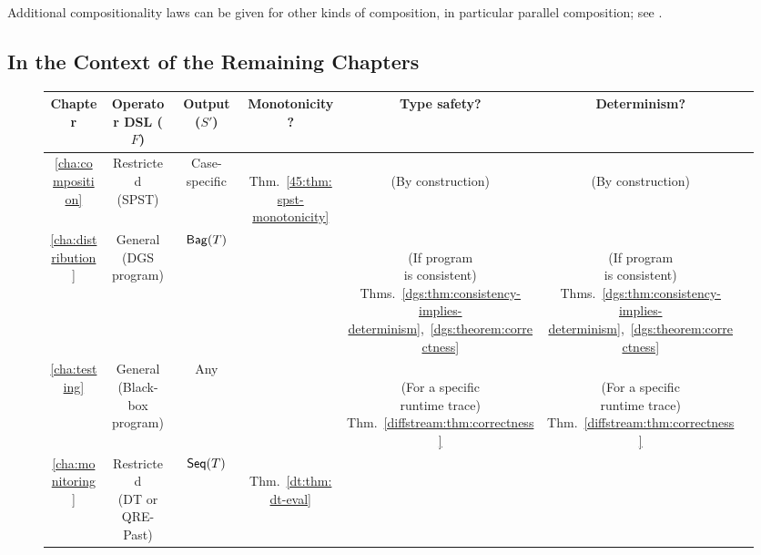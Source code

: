 Additional compositionality laws can be given for other kinds of composition, in particular parallel composition; see .

\subsection{In the Context of the Remaining Chapters}

\begin{figure}[t]
\centering
\small
\renewcommand{\arraystretch}{5}
\setlength{\tabcolsep}{4pt}
\begin{tabular}{ccccccc}
Chapter & Operator DSL ($F$) & Output ($S'$) & Monotonicity? & Type safety? & Determinism? \\
\hline
\ref{cha:composition}
  & \makecell{Restricted \\ (SPST)} & Case-specific
  & \makecell{\Yes{} \\ Thm.~\ref{45:thm:spst-monotonicity}} & \makecell{\Yes{} \\ (By construction)} & \makecell{\Yes{} \\ (By construction)} \\
\ref{cha:distribution}
  & \makecell{General \\ (DGS program)} & $\mathsf{Bag}({T})$
  & \Yes{} & \makecell{\Yes{} \\ (If program \\ is consistent) \\ Thms.~\ref{dgs:thm:consistency-implies-determinism},~\ref{dgs:theorem:correctness}} & \makecell{\Yes{} \\ (If program \\ is consistent) \\ Thms.~\ref{dgs:thm:consistency-implies-determinism},~\ref{dgs:theorem:correctness}} \\
\ref{cha:testing}
  & \makecell{General \\ (Black-box program)} & Any
  & \NA{} & \makecell{\Partial{} \\ (For a specific \\ runtime trace) \\ Thm.~\ref{diffstream:thm:correctness}} & \makecell{\Partial{} \\ (For a specific \\ runtime trace) \\ Thm.~\ref{diffstream:thm:correctness}} \\
\ref{cha:monitoring}
  & \makecell{Restricted \\ (DT or QRE-Past)} & $\mathsf{Seq}({T})$
  & \makecell{\Yes{} \\ Thm.~\ref{dt:thm:dt-eval}} & \NA{} & \Yes{} \\
\end{tabular}


\end{figure}
